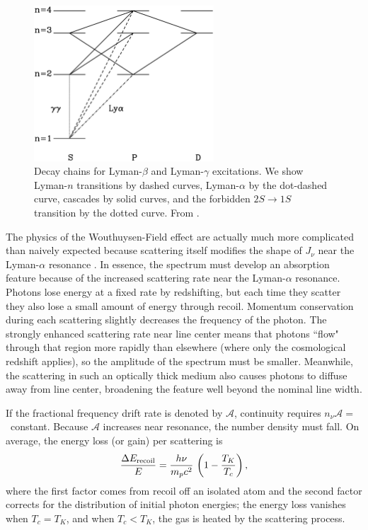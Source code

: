 \documentclass[a4paper,openany, 12pt]{book}
\begin{document}
\begin{figure}[]
\begin{center}
\includegraphics[width=0.6\textwidth]{figure2-3}
\end{center}
\caption{Decay chains for Lyman-$\beta$ and Lyman-$\gamma$ excitations.  We show
  Lyman-$n$ transitions by dashed curves, Lyman-$\alpha$ by the dot-dashed
  curve, cascades by solid curves, and the forbidden $2S \rightarrow
  1S$ transition by the dotted curve. From \cite{pritchard06}.}
\label{fig:lygamma}
\end{figure}

The physics of the Wouthuysen-Field effect are actually much more complicated than naively expected because scattering itself modifies the shape of $J_\nu$ near the Lyman-$\alpha$ resonance \cite{chen04}. In essence, the spectrum must develop an absorption feature because of the increased scattering rate near the Lyman-$\alpha$ resonance. Photons lose energy at a fixed rate by redshifting, but each time they scatter they also lose a small amount of energy through recoil.  Momentum conservation during each scattering slightly decreases the frequency of the photon.  The strongly enhanced scattering rate near line center means that photons ``flow" through
that region more rapidly than elsewhere (where only the cosmological redshift applies), so the amplitude of the spectrum must be smaller.  Meanwhile, the scattering in such an optically thick medium also causes photons to diffuse away from line center, broadening the feature well beyond the nominal line width.

If the fractional frequency drift rate is denoted by ${\mathcal A}$, continuity requires $n_\nu {\mathcal A}=$~constant. Because ${\mathcal A}$ increases near resonance, the number density must fall.  On average, the energy loss (or gain) per scattering is \cite{chen04}
\begin{equation}
\frac{\Delta E_{\rm recoil}}{E} = \frac{h \nu}{m_p c^2} \, \left(1 - \frac{T_K}{T_c} \right),
\label{eq:recoil-loss}
\end{equation}
where the first factor comes from recoil off an isolated atom and the second factor corrects for the distribution of initial photon energies; the energy loss vanishes when $T_c = T_K$, and when $T_c < T_K$, the gas is heated by the scattering process.
\end{document}
